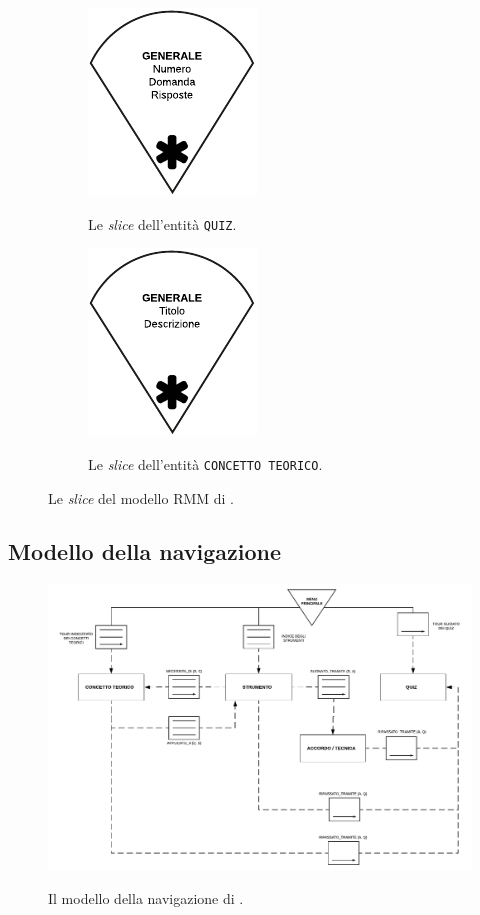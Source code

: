 \begin{figure}[H]\ContinuedFloat
	\begin{subfigure}[t]{.5\textwidth}
		\centering
		\includegraphics[scale=1]{../modello_rmm/slice_quiz}
		\label{fig:slice:quiz}
		\caption{Le \emph{slice} dell'entità \texttt{QUIZ}.}
	\end{subfigure}%
	\begin{subfigure}[t]{.5\textwidth}
		\centering
		\includegraphics[scale=1]{../modello_rmm/slice_concetto_teorico}
		\label{fig:slice:concetto-teorico}
		\caption{Le \emph{slice} dell'entità \texttt{CONCETTO TEORICO}.}
	\end{subfigure}
	\label{fig:slice}
	\caption{Le \emph{slice} del modello RMM di \ProjectTitle{}.}
\end{figure}
\subsection{Modello della navigazione}
\begin{figure}[H]
	\centering
	\includegraphics[width=\textwidth]{../modello_rmm/navigazione}
	\label{fig:modello-navigazione}
	\caption{Il modello della navigazione di \ProjectTitle{}.}
\end{figure}